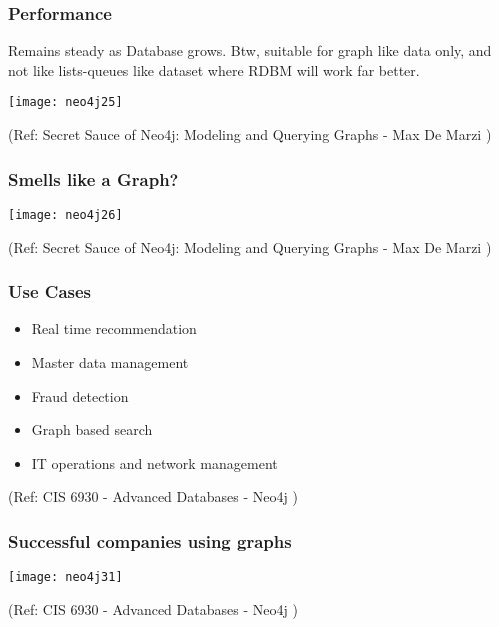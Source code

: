\begin{frame}[fragile]\frametitle{Performance}
Remains steady as Database grows. Btw, suitable for graph like data only, and not like lists-queues like dataset where RDBM will work far better.

\begin{center}
\texttt{[image: neo4j25]}
\end{center}	    

{\tiny (Ref: Secret Sauce of Neo4j: Modeling and Querying Graphs
 - Max De Marzi )}

\end{frame}

\begin{frame}[fragile]\frametitle{Smells like a Graph?}

\begin{center}
\texttt{[image: neo4j26]}
\end{center}	    

{\tiny (Ref: Secret Sauce of Neo4j: Modeling and Querying Graphs
 - Max De Marzi )}

\end{frame}

\begin{frame}\frametitle{Use Cases}


\begin{itemize}
\item  Real time recommendation
\item  Master data management 
\item  Fraud detection
\item  Graph based search 
\item  IT operations and network management 
\end{itemize}


{\tiny (Ref: CIS 6930 - Advanced Databases - Neo4j )}
\end{frame}

\begin{frame}\frametitle{Successful companies using graphs}


\begin{center}
\texttt{[image: neo4j31]}
\end{center}	

{\tiny (Ref: CIS 6930 - Advanced Databases - Neo4j )}
\end{frame}

